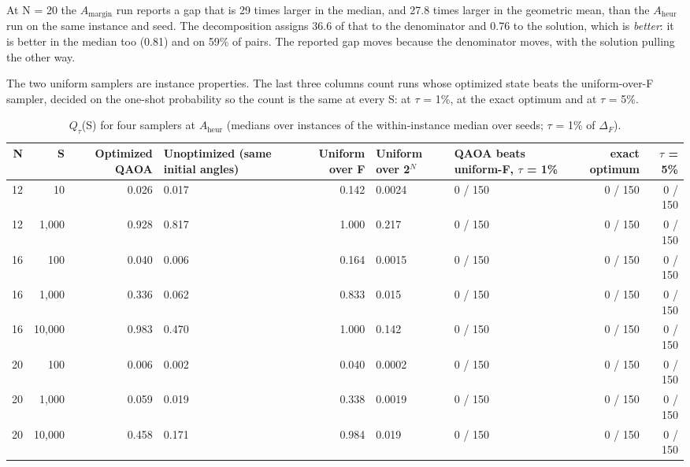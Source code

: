 \documentclass[journal]{IEEEtran}
\begin{document}
At N = 20 the $A_{\mathrm{margin}}$ run reports a gap that is 29 times larger in the median, and 27.8 times larger in the geometric mean, than the $A_{\mathrm{heur}}$ run on the same instance and seed. The decomposition assigns 36.6 of that to the denominator and 0.76 to the solution, which is \textit{better}: it is better in the median too (0.81) and on 59\% of pairs. The reported gap moves because the denominator moves, with the solution pulling the other way.


The two uniform samplers are instance properties. The last three columns count runs whose optimized state beats the uniform-over-F sampler, decided on the one-shot probability so the count is the same at every S: at $\tau$ = 1\%, at the exact optimum and at $\tau$ = 5\%.


\begin{table}[!t]
\centering
\scriptsize
\caption{$Q_{\tau}$(S) for four samplers at $A_{\mathrm{heur}}$ (medians over instances of the within-instance median over seeds; $\tau$ = 1\% of $\Delta_{F}$).}
\label{tab:S14}
\begin{tabular}{rrrp{}rp{}p{}rr}
\toprule
N & S & Optimized QAOA & Unoptimized (same initial angles) & Uniform over F & Uniform over 2$^{N}$ & QAOA beats uniform-F, $\tau$ = 1\% & exact optimum & $\tau$ = 5\% \\
\midrule
12 & 10 & 0.026 & 0.017 & 0.142 & 0.0024 & 0 / 150 & 0 / 150 & 0 / 150 \\
12 & 1,000 & 0.928 & 0.817 & 1.000 & 0.217 & 0 / 150 & 0 / 150 & 0 / 150 \\
16 & 100 & 0.040 & 0.006 & 0.164 & 0.0015 & 0 / 150 & 0 / 150 & 0 / 150 \\
16 & 1,000 & 0.336 & 0.062 & 0.833 & 0.015 & 0 / 150 & 0 / 150 & 0 / 150 \\
16 & 10,000 & 0.983 & 0.470 & 1.000 & 0.142 & 0 / 150 & 0 / 150 & 0 / 150 \\
20 & 100 & 0.006 & 0.002 & 0.040 & 0.0002 & 0 / 150 & 0 / 150 & 0 / 150 \\
20 & 1,000 & 0.059 & 0.019 & 0.338 & 0.0019 & 0 / 150 & 0 / 150 & 0 / 150 \\
20 & 10,000 & 0.458 & 0.171 & 0.984 & 0.019 & 0 / 150 & 0 / 150 & 0 / 150 \\
\bottomrule
\end{tabular}
\end{table}
\end{document}

